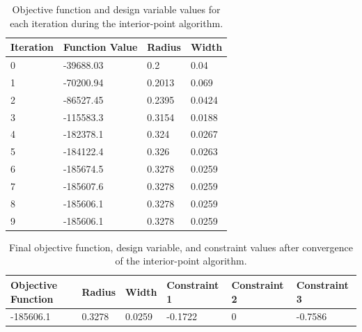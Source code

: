 \documentclass[11pt]{article}
\begin{document}
\begin{solution}
\begin{table}[htbp]
	\centering
    \begin{tabular}{|l|l|l|l|}
        \hline
       Iteration & Function Value & Radius & Width\\ \hline
0 & -39688.03 & 0.2 & 0.04\\ 
1 & -70200.94 & 0.2013 & 0.069\\ 
2 & -86527.45 & 0.2395 & 0.0424\\ 
3 & -115583.3 & 0.3154 & 0.0188\\ 
4 & -182378.1 & 0.324 & 0.0267\\ 
5 & -184122.4 & 0.326 & 0.0263\\ 
6 & -185674.5 & 0.3278 & 0.0259\\ 
7 & -185607.6 & 0.3278 & 0.0259\\ 
8 & -185606.1 & 0.3278 & 0.0259\\ 
9 & -185606.1 & 0.3278 & 0.0259\\ 
        \hline
    \end{tabular}
	\caption{Objective function and design variable values for each iteration during the interior-point algorithm.}
	\label{Table3}
\end{table}

\begin{table}[htbp]
	\centering
    \begin{tabular}{|l|l|l|l|l|l|}
        \hline
	Objective Function & Radius & Width & Constraint 1 & Constraint 2 & Constraint 3 \\ \hline
	-185606.1 & 0.3278 & 0.0259 & -0.1722 & 0 & -0.7586 \\ 
	\hline
    \end{tabular}
	\caption{Final objective function, design variable, and constraint values after convergence of the interior-point algorithm.}
	\label{Table4}
\end{table}

\end{solution}
\end{document}
